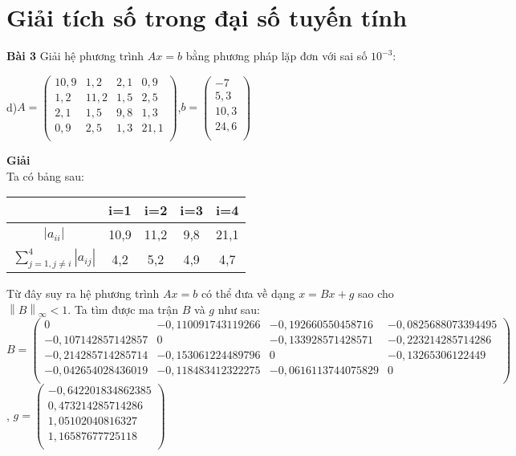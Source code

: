 \chapter{Giải tích số trong đại số tuyến tính}
\textbf{Bài 3} Giải hệ phương trình $Ax=b $ bằng phương pháp lặp đơn với sai số $10^{-3}$:\par
d)$A= \begin{pmatrix}
10,9&1,2&2,1&0,9\\
1,2&11,2&1,5&2,5\\
2,1&1,5&9,8&1,3\\
0,9&2,5&1,3&21,1\\
\end{pmatrix}$,$b= \begin{pmatrix}
-7\\
5,3\\
10,3\\
24,6\\
\end{pmatrix}$
\par
\textbf{Giải}\\
Ta có bảng sau:\\
\begin{center}
\begin{tabular}{|c|c|c|c|c|}\hline
&i=1&i=2&i=3&i=4\\ \hline
$\left|a_{ii} \right|$&10,9&11,2&9,8&21,1\\ \hline
$\sum\limits_{j=1, j\neq i}^{4} \left|a_{ij}\right|$&4,2&5,2&4,9&4,7\\ \hline
\end{tabular}
\end{center}
Từ đây suy ra hệ phương trình $Ax=b$ có thể đưa về dạng $x=Bx+g$ sao cho $\left\|B\right\|_{\infty} <1$.
Ta tìm được ma trận $B$ và $g$ như sau:\\
$B=\begin{pmatrix}
0&-0,110091743119266&-0,192660550458716&-0,0825688073394495\\
-0,107142857142857&0&-0,133928571428571&-0,223214285714286\\
-0,214285714285714&-0,153061224489796&0&-0,13265306122449\\
-0,042654028436019&-0,118483412322275&-0,0616113744075829&0\\
\end{pmatrix}$, $g=\begin{pmatrix}
-0,642201834862385\\
0,473214285714286\\
1,05102040816327\\
1,16587677725118\\
\end{pmatrix}$\\

